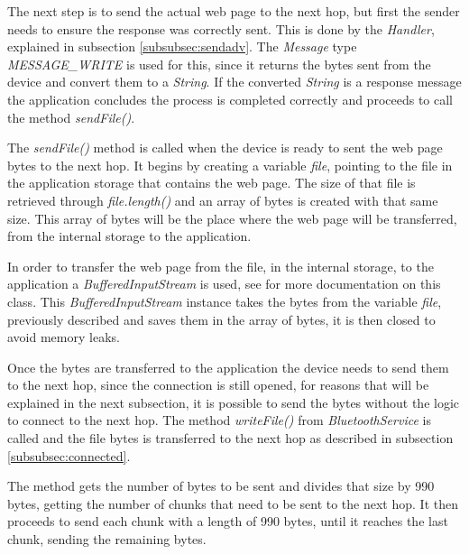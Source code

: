 The next step is to send the actual web page to the next hop, but first the sender needs to ensure the response was correctly sent. This is done by the \textit{Handler}, explained in subsection \ref{subsubsec:sendadv}. The \textit{Message} type \textit{MESSAGE\_WRITE} is used for this, since it returns the bytes sent from the device and convert them to a \textit{String}. If the converted \textit{String} is a response message the application concludes the process is completed correctly and proceeds to call the method \textit{sendFile()}.

The \textit{sendFile()} method is called when the device is ready to sent the web page bytes to the next hop. It begins by creating a variable \textit{file}, pointing to the file in the application storage that contains the web page. The size of that file is retrieved through \textit{file.length()} and an array of bytes is created with that same size. This array of bytes will be the place where the web page will be transferred, from the internal storage to the application.

In order to transfer the web page from the file, in the internal storage, to the application a \textit{BufferedInputStream} is used, see \cite{bis} for more documentation on this class. This \textit{BufferedInputStream} instance takes the bytes from the variable \textit{file}, previously described and saves them in the array of bytes, it is then closed to avoid memory leaks.

Once the bytes are transferred to the application the device needs to send them to the next hop, since the connection is still opened, for reasons that will be explained in the next subsection, it is possible to send the bytes without the logic to connect to the next hop. The method \textit{writeFile()} from \textit{BluetoothService} is called and the file bytes is transferred to the next hop as described in subsection \ref{subsubsec:connected}.

The method gets the number of bytes to be sent and divides that size by 990 bytes, getting the number of chunks that need to be sent to the next hop. It then proceeds to send each chunk with a length of 990 bytes, until it reaches the last chunk, sending the remaining bytes.


